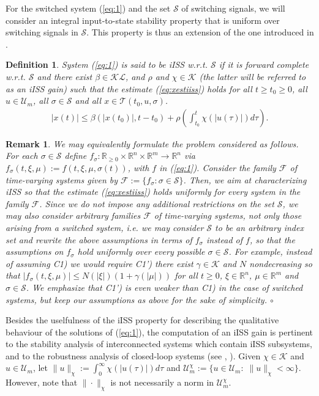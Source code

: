 \documentclass[9pt,final,journal]{IEEEtran}
\newtheorem{defin}{Definition}
\newtheorem{remark}{Remark}
\def\K{\mathcal{K}}
\def\KL{\mathcal{KL}}
\def\R{\mathbb{R}}
\def\S{\mathcal{S}}
\def\T{\mathcal{T}}
\def\U{\mathcal{U}}
\def\F{\mathcal{F}}
\def\mer{\hfill $\circ$}
\begin{document}
For the switched system (\ref{eq:1}) and the set $\S$ of switching signals, we will consider an integral input-to-state stability property that is uniform over switching signals in $\S$. This property is thus an extension of the one introduced in \cite{sontag_scl98}.
\begin{defin}
  \label{def:iiss}
  System (\ref{eq:1}) is said to be iISS w.r.t. $\S$ if it is forward complete w.r.t. $\S$ and there exist $\beta\in\KL$, and $\rho$ and $\chi \in\K$ (the latter will be referred to as an iISS gain) such that the estimate (\ref{eq:xestiiss}) holds for all $t\ge t_0\ge 0$, all $u\in \U_m$, all $\sigma\in \S$ and all $x\in \T(t_0,u,\sigma)$.
  \begin{align}
    \label{eq:xestiiss}
    |x(t)| \le \beta(|x(t_0)|,t-t_0) + \rho\left(\int_{t_0}^t \chi(|u(\tau)|) d\tau \right).
  \end{align}
\end{defin}
\begin{remark}
  \label{rem:families}
  We may equivalently formulate the problem considered as follows. For each $\sigma\in\S$ define $f_\sigma : \R_{\ge 0} \times \R^n \times \R^m \to \R^n$ via $f_\sigma(t,\xi,\mu) := f(t,\xi,\mu,\sigma(t))$, with $f$ in (\ref{eq:1}). Consider the family $\F$ of time-varying systems given by $\F:= \{f_\sigma : \sigma\in\S\}$. Then, we aim at characterizing iISS so that the estimate (\ref{eq:xestiiss}) holds uniformly for every system in the family $\F$. Since we do not impose any additional restrictions on the set $\S$, we may also consider arbitrary families $\F$ of time-varying systems, not only those arising from a switched system, i.e. we may consider $\S$ to be an arbitrary index set and rewrite the above assumptions in terms of $f_\sigma$ instead of $f$, so that the assumptions on $f_\sigma$ hold uniformly over every possible $\sigma\in\S$. For example, instead of assuming C1) %
  we would require C1') there exist $\gamma \in \K$ and $N$ nondecreasing so that $|f_\sigma(t,\xi,\mu)|\le N(|\xi|)(1+\gamma(|\mu|))$ for all $t\ge 0$, $\xi\in \R^n$, $\mu \in \R^m$ and $\sigma\in\S$. We emphasize that C1') is even weaker than C1) in the case of switched systems, but keep our assumptions as above for the sake of simplicity. %
  \mer
\end{remark}
Besides the uselfulness of the iISS property for describing the qualitative behaviour of the solutions of (\ref{eq:1}), the computation of an iISS gain is pertinent to the stability analysis of interconnected systems which contain iISS subsystems, and to the robustness analysis of closed-loop systems (see \cite{arcang_siamjco02}, \cite{itojia_cdc06}).
%
Given $\chi \in \K$ and $u\in \U_m$, let $\|u\|_{\chi}:=\int_{0}^{\infty} \chi(|u(\tau)|) d\tau$ and $\U_m^\chi:=\{u\in \U_m:\;\|u\|_{\chi}<\infty\}$. However, note that $\|\cdot\|_{\chi}$ is not necessarily a norm in $\U_m^\chi$.
\end{document}
